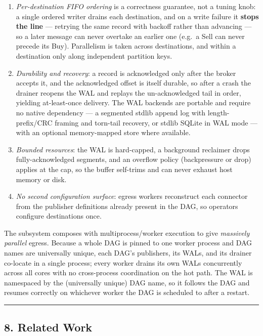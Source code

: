 \documentclass[
]{article}
\providecommand{\tightlist}{%
  \setlength{\itemsep}{0pt}\setlength{\parskip}{0pt}}
\begin{document}
\begin{enumerate}
\def\labelenumi{\arabic{enumi}.}
\tightlist
\item
  \emph{Per-destination FIFO ordering} is a correctness guarantee, not a
  tuning knob: a single ordered writer drains each destination, and on a
  write failure it \textbf{stops the line} --- retrying the same record
  with backoff rather than advancing --- so a later message can never
  overtake an earlier one (e.g.~a Sell can never precede its Buy).
  Parallelism is taken across destinations, and within a destination
  only along independent partition keys.
\item
  \emph{Durability and recovery}: a record is acknowledged only after
  the broker accepts it, and the acknowledged offset is itself durable,
  so after a crash the drainer reopens the WAL and replays the
  un-acknowledged tail in order, yielding at-least-once delivery. The
  WAL backends are portable and require no native dependency --- a
  segmented stdlib append log with length-prefix/CRC framing and
  torn-tail recovery, or stdlib SQLite in WAL mode --- with an optional
  memory-mapped store where available.
\item
  \emph{Bounded resources}: the WAL is hard-capped, a background
  reclaimer drops fully-acknowledged segments, and an overflow policy
  (backpressure or drop) applies at the cap, so the buffer self-trims
  and can never exhaust host memory or disk.
\item
  \emph{No second configuration surface}: egress workers reconstruct
  each connector from the publisher definitions already present in the
  DAG, so operators configure destinations once.
\end{enumerate}

The subsystem composes with multiprocess/worker execution to give
\emph{massively parallel} egress. Because a whole DAG is pinned to one
worker process and DAG names are universally unique, each DAG's
publishers, its WALs, and its drainer co-locate in a single process;
every worker drains its own WALs concurrently across all cores with no
cross-process coordination on the hot path. The WAL is namespaced by the
(universally unique) DAG name, so it follows the DAG and resumes
correctly on whichever worker the DAG is scheduled to after a restart.

\begin{center}\rule{0.5\linewidth}{0.5pt}\end{center}

\hypertarget{related-work}{%
\subsection{8. Related Work}\label{related-work}}
\end{document}
